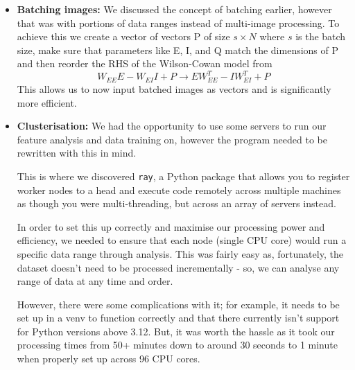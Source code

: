 \documentclass[10pt]{article}
\begin{document}
\begin{flushleft}
\begin{itemize}
        After a small amount of research and exploration of numerical schemes, we decided to use the Forward Euler scheme.
        This is because it has a $5\times$ faster runtime as it uses five less function calls per iteration
        than RK4. As you can imagine, it was noticeably faster when running test programs.
        If you want an explanation as to why function calls are so expensive in Python, read
        \hyperref[sec:why-are-function-calls-expensive]{Appendix: Why are function calls expensive?}.
        It is important to note that FE requires a significantly smaller time step in order to produce meaningful results and is further from the true solution than other methods (see Figure \ref{fig:comparison of methods}), so it is arguable whether it is the better choice of method.
        \item \textbf{Batching images:} We discussed the concept of batching earlier, however that was with portions of
        data ranges instead of multi-image processing.
        To achieve this we create a vector of vectors P of size $s \times N$ where $s$ is the batch size, make sure
        that parameters like E, I, and Q match the dimensions of P and then reorder the RHS of the Wilson-Cowan model from
        \[
            W_{EE} E - W_{EI} I + P \longrightarrow E W_{EE}^{T} - I W_{EI}^{T} + P
        \]
        This allows us to now input batched images as vectors and is significantly more efficient.
        \item \textbf{Clusterisation:} We had the opportunity to use some servers to run our feature analysis
        and data training on, however the program needed to be rewritten with this in mind.
        
        This is where we discovered \texttt{ray}, a Python package that allows you to register worker nodes to a head
        and execute code remotely across multiple machines as though you were multi-threading, but across an array
        of servers instead.
        
        In order to set this up correctly and maximise our processing power and efficiency, we needed to ensure that each
        node (single CPU core) would run a specific data range through analysis.
        This was fairly easy as, fortunately, the dataset doesn't need to be processed incrementally - so, we can analyse
        any range of data at any time and order.
        
        However, there were some complications with it; for example, it needs to be set up in a venv to function correctly and that
        there currently isn't support for Python versions above 3.12.
        But, it was worth the hassle as it took our processing times from 50+ minutes down to around 30 seconds to 1 minute
        when properly set up across 96 CPU cores.
    \end{itemize}


\end{flushleft}
\end{document}
